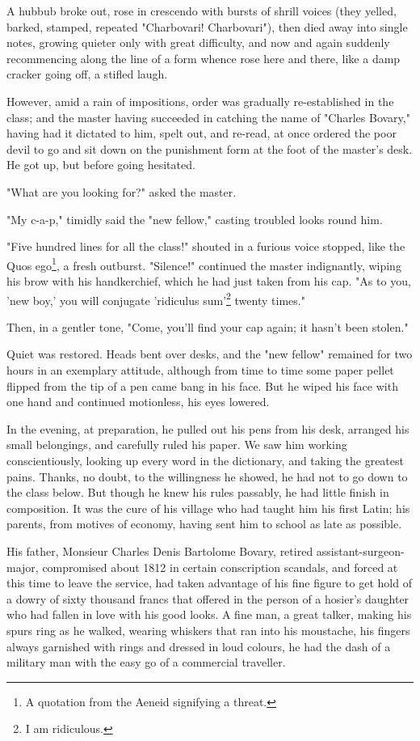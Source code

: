 \documentclass{tufte-book}
\begin{document}
A hubbub broke out, rose in crescendo with bursts of shrill voices (they
yelled, barked, stamped, repeated "Charbovari! Charbovari"), then died
away into single notes, growing quieter only with great difficulty, and
now and again suddenly recommencing along the line of a form whence rose
here and there, like a damp cracker going off, a stifled laugh.

However, amid a rain of impositions, order was gradually re-established
in the class; and the master having succeeded in catching the name of
"Charles Bovary," having had it dictated to him, spelt out, and re-read,
at once ordered the poor devil to go and sit down on the punishment form
at the foot of the master's desk. He got up, but before going hesitated.

"What are you looking for?" asked the master.

"My c-a-p," timidly said the "new fellow," casting troubled looks round
him.

"Five hundred lines for all the class!" shouted in a furious voice
stopped, like the Quos ego\footnote{A quotation from the Aeneid signifying a threat.}, a fresh outburst. "Silence!" continued the
master indignantly, wiping his brow with his handkerchief, which he
had just taken from his cap. "As to you, 'new boy,' you will conjugate
'ridiculus sum'\footnote{I am ridiculous.} twenty times."

Then, in a gentler tone, "Come, you'll find your cap again; it hasn't
been stolen."

     

Quiet was restored. Heads bent over desks, and the "new fellow" remained
for two hours in an exemplary attitude, although from time to time some
paper pellet flipped from the tip of a pen came bang in his face. But he
wiped his face with one hand and continued motionless, his eyes lowered.

In the evening, at preparation, he pulled out his pens from his desk,
arranged his small belongings, and carefully ruled his paper. We saw him
working conscientiously, looking up every word in the dictionary, and
taking the greatest pains. Thanks, no doubt, to the willingness he
showed, he had not to go down to the class below. But though he knew his
rules passably, he had little finish in composition. It was the cure
of his village who had taught him his first Latin; his parents, from
motives of economy, having sent him to school as late as possible.

His father, Monsieur Charles Denis Bartolome Bovary, retired
assistant-surgeon-major, compromised about 1812 in certain conscription
scandals, and forced at this time to leave the service, had taken
advantage of his fine figure to get hold of a dowry of sixty thousand
francs that offered in the person of a hosier's daughter who had fallen
in love with his good looks. A fine man, a great talker, making his
spurs ring as he walked, wearing whiskers that ran into his moustache,
his fingers always garnished with rings and dressed in loud colours,
he had the dash of a military man with the easy go of a commercial
traveller.
\end{document}
